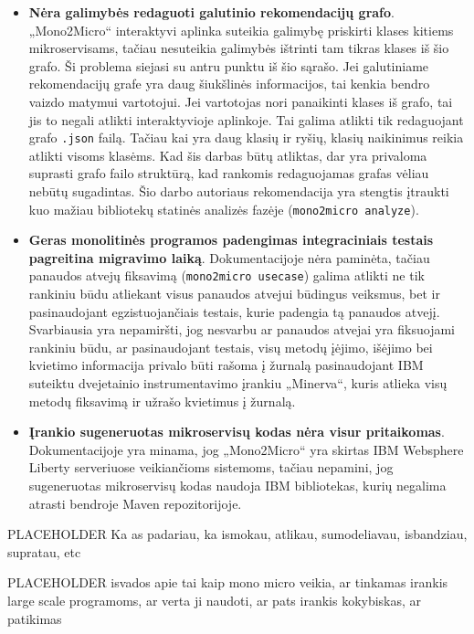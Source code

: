 \documentclass{VUMIFPSbakalaurinis}
\begin{document}
\begin{itemize}
    \item \textbf{Nėra galimybės redaguoti galutinio rekomendacijų grafo}. „Mono2Micro“ interaktyvi aplinka suteikia galimybę priskirti klases kitiems mikroservisams, tačiau nesuteikia galimybės ištrinti tam tikras klases iš šio grafo. Ši problema siejasi su antru punktu iš šio sąrašo. Jei galutiniame rekomendacijų grafe yra daug šiukšlinės informacijos, tai kenkia bendro vaizdo matymui vartotojui. Jei vartotojas nori panaikinti klases iš grafo, tai jis to negali atlikti interaktyvioje aplinkoje. Tai galima atlikti tik redaguojant grafo \verb|.json| failą. Tačiau kai yra daug klasių ir ryšių, klasių naikinimus reikia atlikti visoms klasėms. Kad šis darbas būtų atliktas, dar yra privaloma suprasti grafo failo struktūrą, kad rankomis redaguojamas grafas vėliau nebūtų sugadintas. Šio darbo autoriaus rekomendacija yra stengtis įtraukti kuo mažiau bibliotekų statinės analizės fazėje (\verb|mono2micro analyze|).

    \item \textbf{Geras monolitinės programos padengimas integraciniais testais pagreitina migravimo laiką}. Dokumentacijoje nėra paminėta, tačiau panaudos atvejų fiksavimą (\verb|mono2micro usecase|) galima atlikti ne tik rankiniu būdu atliekant visus panaudos atvejui būdingus veiksmus, bet ir pasinaudojant egzistuojančiais testais, kurie padengia tą panaudos atvejį. Svarbiausia yra nepamiršti, jog nesvarbu ar panaudos atvejai yra fiksuojami rankiniu būdu, ar pasinaudojant testais, visų metodų įėjimo, išėjimo bei kvietimo informacija privalo būti rašoma į žurnalą pasinaudojant IBM suteiktu dvejetainio instrumentavimo įrankiu „Minerva“, kuris atlieka visų metodų fiksavimą ir užrašo kvietimus į žurnalą.

    \item \textbf{Įrankio sugeneruotas mikroservisų kodas nėra visur pritaikomas}. Dokumentacijoje yra minama, jog „Mono2Micro“ yra skirtas IBM Websphere Liberty serveriuose veikiančioms sistemoms, tačiau nepamini, jog sugeneruotas mikroservisų kodas naudoja IBM bibliotekas, kurių negalima atrasti bendroje Maven repozitorijoje. 
\end{itemize}


PLACEHOLDER Ka as padariau, ka ismokau, atlikau, sumodeliavau, isbandziau, supratau, etc

PLACEHOLDER isvados apie tai kaip mono micro veikia, ar tinkamas irankis large scale programoms, ar verta ji naudoti, ar pats irankis kokybiskas, ar patikimas
\end{document}
